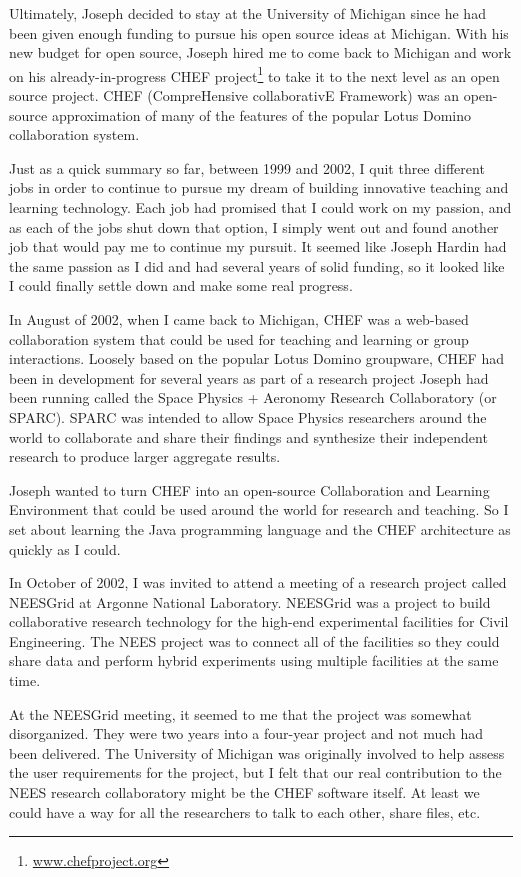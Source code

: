 \documentclass[12pt]{book}
\begin{document}
Ultimately, Joseph decided to stay at the University of Michigan
since he had been given enough funding to pursue his
open source ideas at Michigan.  With his new budget for open source,
Joseph hired me to come back to Michigan
and work on his already-in-progress CHEF project\footnote{\url{www.chefproject.org}}
to take it to the next level as an open source project.
CHEF (CompreHensive collaborativE Framework)
was an open-source approximation of many of the features of
the popular Lotus Domino collaboration system.

Just as a quick summary so far, between 1999 and 2002,
I quit three different jobs in order to continue to
pursue my dream of building innovative teaching and learning
technology.  Each job had promised that I could work
on my passion, and as each of the jobs shut down that
option, I simply went out and found another
job that would pay me to continue my pursuit.  It seemed like
Joseph Hardin had the same passion as I did and had several
years of solid funding, so it looked like I could finally
settle down and make some real progress.

In August of 2002, when I came back to Michigan, CHEF was a web-based
collaboration system that could be used for teaching and learning
or group interactions.  Loosely based
on the popular Lotus Domino groupware,
CHEF had been in development for several years as part of
a research project Joseph had been running called the
Space Physics + Aeronomy Research Collaboratory (or SPARC).
SPARC was intended to allow Space Physics researchers around the
world to collaborate and share their findings and synthesize their
independent research to produce larger aggregate results.

Joseph wanted to turn CHEF into an open-source Collaboration and
Learning Environment that could be used around the world for research
and teaching.  So I set about learning the Java programming language
and the CHEF architecture as quickly as I could.

In October of 2002, I was invited to attend a meeting of a research
project called NEESGrid at Argonne National Laboratory.  NEESGrid
was a project to build collaborative
research technology for the high-end experimental facilities for Civil
Engineering.  The NEES project was to connect all of the facilities
so they could share data and perform hybrid experiments using multiple
facilities at the same time.

At the NEESGrid meeting, it seemed to me that the project was somewhat
disorganized.  They were two years into a four-year project and
not much had been delivered.  The University of Michigan
was originally involved to help assess the user requirements for the
project, but I felt that our real contribution to the NEES research
collaboratory might be the CHEF software itself.  At least we could
have a way for all the researchers to talk to
each other, share files, etc.
\end{document}
